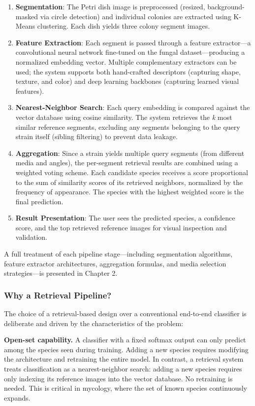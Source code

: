\begin{enumerate}
\def\labelenumi{\arabic{enumi}.}
\item
  \textbf{Segmentation}: The Petri dish image is preprocessed (resized, background-masked via circle detection) and individual colonies are extracted using K-Means clustering. Each dish yields three colony segment images.
\item
  \textbf{Feature Extraction}: Each segment is passed through a feature extractor---a convolutional neural network fine-tuned on the fungal dataset---producing a normalized embedding vector. Multiple complementary extractors can be used; the system supports both hand-crafted descriptors (capturing shape, texture, and color) and deep learning backbones (capturing learned visual features).
\item
  \textbf{Nearest-Neighbor Search}: Each query embedding is compared against the vector database using cosine similarity. The system retrieves the \emph{k} most similar reference segments, excluding any segments belonging to the query strain itself (sibling filtering) to prevent data leakage.
\item
  \textbf{Aggregation}: Since a strain yields multiple query segments (from different media and angles), the per-segment retrieval results are combined using a weighted voting scheme. Each candidate species receives a score proportional to the sum of similarity scores of its retrieved neighbors, normalized by the frequency of appearance. The species with the highest weighted score is the final prediction.
\item
  \textbf{Result Presentation}: The user sees the predicted species, a confidence score, and the top retrieved reference images for visual inspection and validation.
\end{enumerate}

A full treatment of each pipeline stage---including segmentation algorithms, feature extractor architectures, aggregation formulas, and media selection strategies---is presented in Chapter 2.

\subsubsection{Why a Retrieval Pipeline?}\label{why-a-retrieval-pipeline}

The choice of a retrieval-based design over a conventional end-to-end classifier is deliberate and driven by the characteristics of the problem:

\textbf{Open-set capability.} A classifier with a fixed softmax output can only predict among the species seen during training. Adding a new species requires modifying the architecture and retraining the entire model. In contrast, a retrieval system treats classification as a nearest-neighbor search: adding a new species requires only indexing its reference images into the vector database. No retraining is needed. This is critical in mycology, where the set of known species continuously expands.

